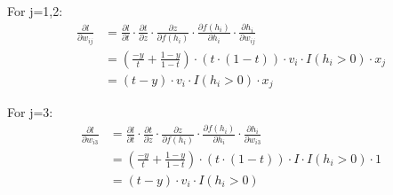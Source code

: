 \documentclass{article}
\begin{document}
\begin{enumerate}
    For j=1,2:
    \begin{align*}
        \frac{\partial l}{\partial w_{ij}} &= \frac{\partial l}{\partial t}\cdot\frac{\partial t}{\partial z}\cdot\frac{\partial z}{\partial f(h_i)}\cdot
        \frac{\partial f(h_i)}{\partial h_i}\cdot\frac{\partial h_i}{\partial w_{ij}} \\
        &= (\frac{-y}{t}+\frac{1-y}{1-t}) \cdot (t\cdot(1-t))\cdot v_i\cdot I(h_i>0)\cdot x_j \\
        &= (t-y)\cdot v_i\cdot I(h_i>0)\cdot x_j
    \end{align*}

    For j=3:
    \begin{align*}
        \frac{\partial l}{\partial w_{i3}} &= \frac{\partial l}{\partial t} \cdot \frac{\partial t}{\partial z} \cdot \frac{\partial z}{\partial f(h_i)}\cdot
        \frac{\partial f(h_i)}{\partial h_i} \cdot \frac{\partial h_i}{\partial w_{i3}}\\
        &= (\frac{-y}{t}+\frac{1-y}{1-t}) \cdot (t\cdot(1-t))\cdot I \cdot I(h_i>0) \cdot 1 \\
        &= (t-y)\cdot v_i \cdot I(h_i>0)
    \end{align*}
\end{enumerate}
\end{document}
